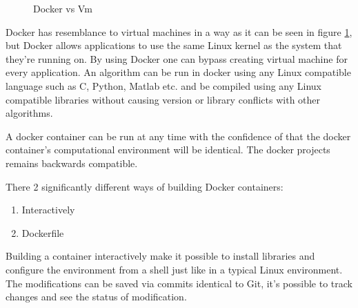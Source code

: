 \begin{figure}[bth]
    \centering
    \qquad
    \caption{Docker vs Vm}
    \label{fig:dockervm}
\end{figure}

Docker has resemblance to virtual machines in a way as it can be seen in figure \ref{fig:dockervm}, but Docker allows applications to use the same Linux kernel as the system that they’re running on. By using Docker one can bypass creating virtual machine for every application. 
An algorithm can be run in docker using any Linux compatible language such as C, Python, Matlab etc. and be compiled using any Linux compatible libraries without causing version or library conflicts with other algorithms.

A docker container can be run at any time with the confidence of that the docker container’s computational environment will be identical. The docker projects remains backwards compatible. 


There 2 significantly different ways of building Docker containers:

\begin{enumerate}
	\item Interactively
	\item Dockerfile
\end{enumerate} 

Building a container interactively make it possible to install libraries and configure the environment from a shell just like in a typical Linux environment. The modifications can be saved via commits identical to Git, it’s possible to track changes and see the status of modification.\\  

